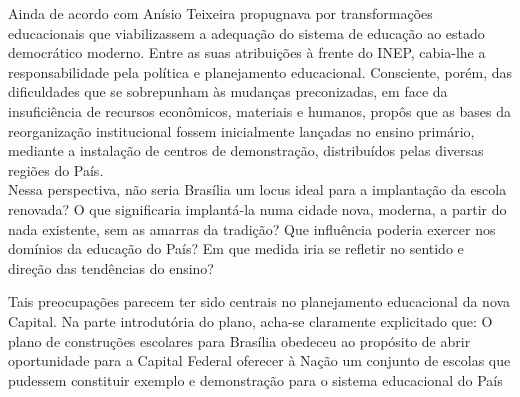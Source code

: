 Ainda de acordo com  Anísio Teixeira propugnava por transformações educacionais que viabilizassem
a adequação do sistema de educação ao estado democrático moderno. Entre as suas
atribuições à frente do INEP, cabia-lhe a responsabilidade pela política e planejamento
educacional. Consciente, porém, das dificuldades que se sobrepunham às mudanças
preconizadas, em face da insuficiência de recursos econômicos, materiais e humanos,
propôs que as bases da reorganização institucional fossem inicialmente lançadas no
ensino primário, mediante a instalação de centros de demonstração, distribuídos pelas
diversas regiões do País. \\

Nessa perspectiva, não seria Brasília um locus ideal para a implantação da escola
renovada? O que significaria implantá-la numa cidade nova, moderna, a partir do nada
existente, sem as amarras da tradição? Que influência poderia exercer nos domínios da educação do País? Em que medida iria se refletir no sentido e direção das tendências do
ensino? \\
\begin{citacao}
    Tais preocupações parecem ter sido centrais no planejamento educacional da
    nova Capital. Na parte introdutória do plano, acha-se claramente explicitado que:
    O plano de construções escolares para Brasília obedeceu ao propósito de
    abrir oportunidade para a Capital Federal oferecer à Nação um conjunto de
    escolas que pudessem constituir exemplo e demonstração para o sistema
    educacional do País
\end{citacao}